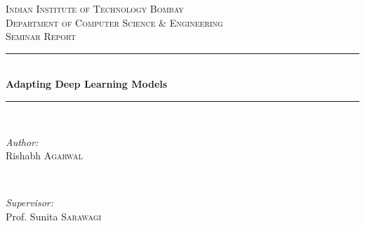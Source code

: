 \begin{titlepage}

\newcommand{\HRule}{\rule{\linewidth}{0.5mm}} %

\center %
 

\textsc{\LARGE Indian Institute of Technology Bombay}\\[1cm] %
\textsc{\Large Department of Computer Science \& Engineering}\\[0.5cm] %
\textsc{\large Seminar Report}\\[0.5cm] %


\HRule \\[0.4cm]
{ \huge \bfseries Adapting Deep Learning Models}\\[0.4cm] %
\HRule \\[1.5cm]
 

\begin{minipage}{0.4\textwidth}
\begin{flushleft} \large
\emph{Author:}\\
Rishabh \textsc{Agarwal} %
\end{flushleft}
\end{minipage}
~
\begin{minipage}{0.4\textwidth}
\begin{flushright} \large
\emph{Supervisor:} \\
Prof. Sunita \textsc{Sarawagi} %
\end{flushright}
\end{minipage}\\[2cm]



\end{titlepage}
